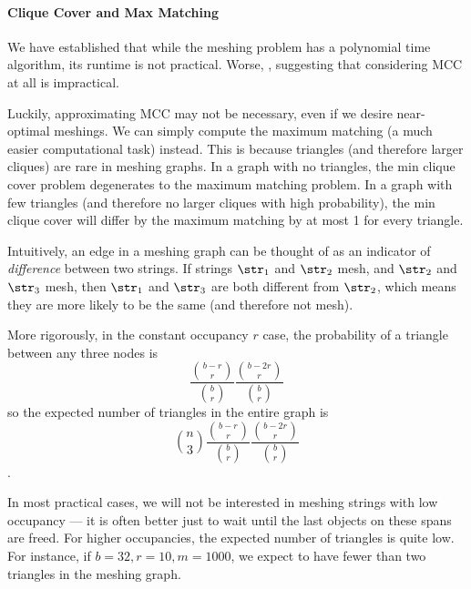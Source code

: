 \paragraph{Clique Cover and Max Matching}
\fi


\iffalse
We have established that while the meshing problem has a polynomial time algorithm, its runtime is not practical.  Worse, , suggesting that considering MCC at all is impractical.

Luckily, approximating MCC may not be necessary, even if we desire near-optimal meshings. We can simply compute the maximum matching (a much easier computational task) instead.  This is because triangles (and therefore larger cliques) are rare in meshing graphs.  In a graph with no triangles, the min clique cover problem degenerates to the maximum matching problem.  In a graph with few triangles (and therefore no larger cliques with high probability), the min clique cover will differ by the maximum matching by at most 1 for every triangle.

Intuitively, an edge in a meshing graph can be thought of as an indicator of \textit{difference} between two strings.  If strings $\str_1$ and $\str_2$ mesh, and $\str_2$ and $\str_3$ mesh, then $\str_1$ and $\str_3$ are both different from $\str_2$, which means they are more likely to be the same (and therefore not mesh).


More rigorously, in the constant occupancy $r$ case, the probability of a triangle between any three nodes is $$\frac{{{b-r}\choose{r}}}{{{b}\choose{r}}}\frac{{{b-2r}\choose{r}}}{{{b}\choose{r}}}$$ so the expected number of triangles in the entire graph is $${{n}\choose{3}}\frac{{{b-r}\choose{r}}}{{{b}\choose{r}}}\frac{{{b-2r}\choose{r}}}{{{b}\choose{r}}}$$.

In most practical cases, we will not be interested in meshing strings with low occupancy --- it is often better just to wait until the last objects on these spans are freed.  For higher occupancies, the expected number of triangles is quite low.  For instance, if $b = 32, r = 10, m = 1000$, we expect to have fewer than two triangles in the meshing graph.

